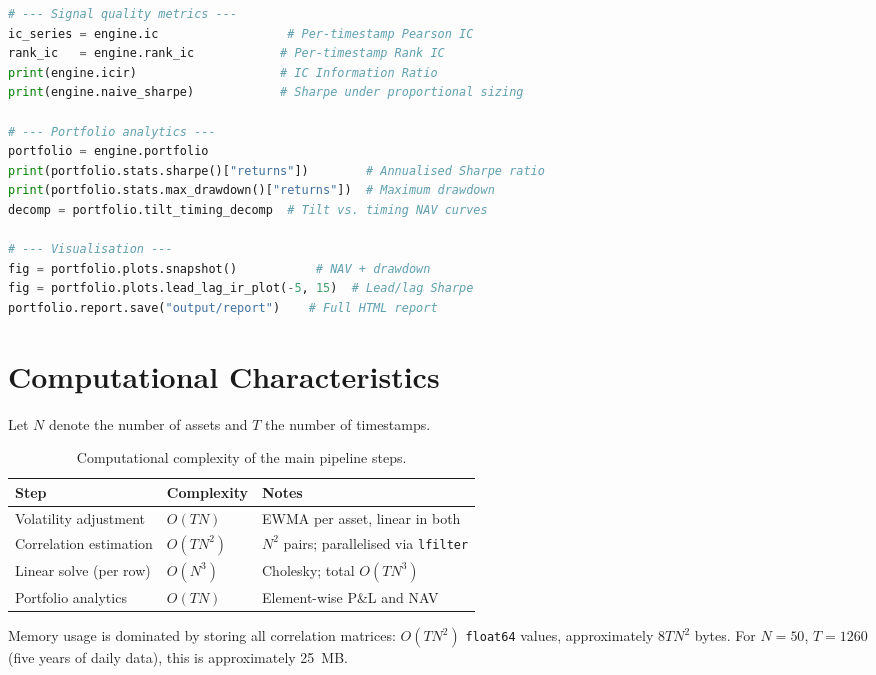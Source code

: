 \documentclass[11pt,a4paper]{article}
\begin{document}
\begin{lstlisting}[language=Python,
                   caption={End-to-end example: optimization and analytics.}]
# --- Signal quality metrics ---
ic_series = engine.ic                  # Per-timestamp Pearson IC
rank_ic   = engine.rank_ic            # Per-timestamp Rank IC
print(engine.icir)                    # IC Information Ratio
print(engine.naive_sharpe)            # Sharpe under proportional sizing

# --- Portfolio analytics ---
portfolio = engine.portfolio
print(portfolio.stats.sharpe()["returns"])        # Annualised Sharpe ratio
print(portfolio.stats.max_drawdown()["returns"])  # Maximum drawdown
decomp = portfolio.tilt_timing_decomp  # Tilt vs. timing NAV curves

# --- Visualisation ---
fig = portfolio.plots.snapshot()           # NAV + drawdown
fig = portfolio.plots.lead_lag_ir_plot(-5, 15)  # Lead/lag Sharpe
portfolio.report.save("output/report")    # Full HTML report
\end{lstlisting}

\section{Computational Characteristics}
\label{sec:compute}

Let $N$ denote the number of assets and $T$ the number of timestamps.

\begin{table}[h]
  \centering
  \caption{Computational complexity of the main pipeline steps.}
  \label{tab:complexity}
  \begin{tabular}{lll}
    \toprule
    \textbf{Step} & \textbf{Complexity} & \textbf{Notes} \\
    \midrule
    Volatility adjustment  & $O(TN)$   & EWMA per asset, linear in both \\
    Correlation estimation & $O(TN^2)$ & $N^2$ pairs; parallelised via \texttt{lfilter} \\
    Linear solve (per row) & $O(N^3)$  & Cholesky; total $O(TN^3)$ \\
    Portfolio analytics    & $O(TN)$   & Element-wise P\&L and NAV \\
    \bottomrule
  \end{tabular}
\end{table}

Memory usage is dominated by storing all correlation matrices:
$O(TN^2)$ \texttt{float64} values, approximately
$8 T N^2$ bytes.  For $N=50$, $T=1260$ (five years of daily data), this
is approximately 25~MB.
\end{document}
